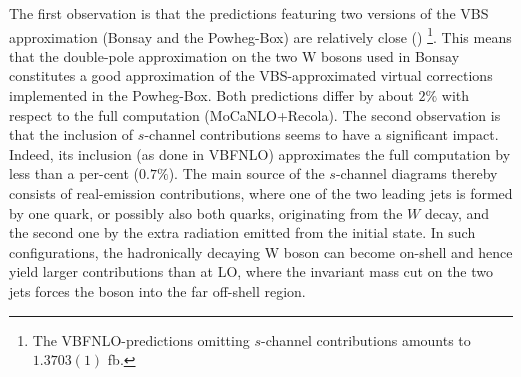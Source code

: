 The first observation is that the predictions featuring two versions of the VBS approximation ({\sc Bonsay} and the {\sc Powheg-Box}) are relatively close ()
\footnote{The {\sc VBFNLO}-predictions omitting $s$-channel contributions amounts to $1.3703(1)$ fb.}.
This means that the double-pole approximation on the two W bosons used in {\sc Bonsay} constitutes a good approximation of the VBS-approximated virtual corrections implemented in the {\sc Powheg-Box}.
Both predictions differ by about $2\%$ with respect to the full computation ({\sc MoCaNLO+Recola}).
The second observation is that the inclusion of $s$-channel contributions seems to have a significant impact.
Indeed, its inclusion (as done in {\sc VBFNLO}) approximates the full computation by less than a per-cent ($0.7\%$).
The main source of the $s$-channel diagrams thereby consists of
real-emission contributions, where one of the two leading jets is formed
by one quark, or possibly also both quarks, originating from the $W$
decay, and the second one by the extra radiation emitted from the
initial state. In such configurations, the hadronically decaying W boson
can become on-shell and hence yield larger contributions than at LO, where the
invariant mass cut on the two jets forces the boson into the far
off-shell region.
